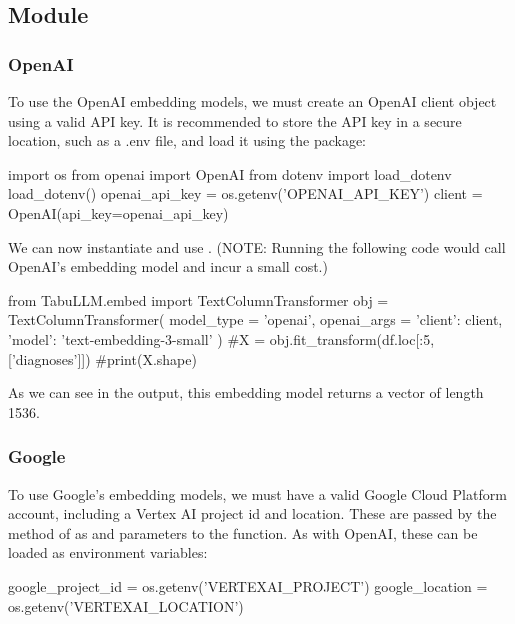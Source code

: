 \documentclass[article]{jss}
\begin{document}
\subsection[embed Module]{ Module}\label{subsec:using-embed}

\subsubsection{OpenAI}\label{subsubsec:using-embed-openai}

To use the OpenAI embedding models, we must create an OpenAI client object using a valid API key. It is recommended to store the API key in a secure location, such as a .env file, and load it using the  package:
\begin{pyblock}
import os
from openai import OpenAI
from dotenv import load_dotenv
load_dotenv()
openai_api_key = os.getenv('OPENAI_API_KEY')
client = OpenAI(api_key=openai_api_key)
\end{pyblock}
We can now instantiate and use . (NOTE: Running the following code would call OpenAI's embedding model and incur a small cost.)
\begin{pyblock}
from TabuLLM.embed import TextColumnTransformer
obj = TextColumnTransformer(
  model_type = 'openai',
  openai_args = {
    'client': client, 
    'model': 'text-embedding-3-small'
  }
)
#X = obj.fit_transform(df.loc[:5, ['diagnoses']])
#print(X.shape)
\end{pyblock}

As we can see in the output, this embedding model returns a vector of length 1536.

\subsubsection{Google}\label{subsubsec:using-embed-google}

To use Google's embedding models, we must have a valid Google Cloud Platform account, including a Vertex AI project id and location. These are passed by the  method of  as  and  parameters to the  function. As with OpenAI, these can be loaded as environment variables:
\begin{pyblock}
google_project_id = os.getenv('VERTEXAI_PROJECT')
google_location = os.getenv('VERTEXAI_LOCATION')
\end{pyblock}
\end{document}
